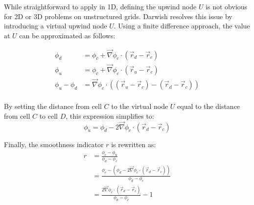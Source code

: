 While straightforward to apply in 1D, defining the upwind node $U$ is not obvious for 2D or 3D problems on unstructured grids.
Darwish resolves this issue by introducing a virtual upwind node $U$. Using a finite difference approach, the value at $U$ can be approximated as follows:

\begin{equation}
  \begin{aligned}
  \phi_d &= \phi_c + \vec{\nabla} \phi_c \cdot \left(\vec{r}_d - \vec{r}_c\right) \\
  \phi_u &= \phi_c + \vec{\nabla} \phi_c \cdot \left(\vec{r}_u - \vec{r}_c\right) \\
  \phi_u - \phi_d &= \vec{\nabla} \phi_c \cdot \left(\left(\vec{r}_u - \vec{r}_c\right) - \left(\vec{r}_d - \vec{r}_c\right)\right) \\
  \end{aligned}
\end{equation}

By setting the distance from cell $C$ to the virtual node $U$ equal to the distance from cell $C$ to cell $D$, this expression simplifies to:
\begin{equation}
 \phi_u = \phi_d - 2 \vec{\nabla} \phi_c \cdot \left(\vec{r}_d - \vec{r}_c\right)
\end{equation}

Finally, the smoothness indicator $r$ is rewritten as:
\begin{equation}
   \begin{aligned}
      r &= \frac{\phi_c - \phi_u}{\phi_d - \phi_c} \\ 
      &= \frac{\phi_c - \left(\phi_d - 2 \vec{\nabla} \phi_c \cdot \left(\vec{r}_d - \vec{r}_c\right)\right)}{\phi_d - \phi_c} \\
      &= \frac{2\vec{\nabla} \phi_c \cdot \left(\vec{r}_d - \vec{r}_c\right)}{\phi_d - \phi_c} - 1
  \end{aligned}
\end{equation}

